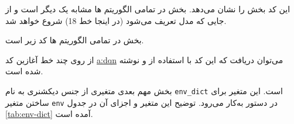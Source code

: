 

این کد بخش  را نشان می‌دهد. بخش  در تمامی الگوریتم ها مشابه یک دیگر است و از جایی که مدل تعریف می‌شود (در اینجا خط 18) شروع خواهد شد. 

بخش  در تمامی الگوریتم ها کد زیر است.


از روی چند خط آغازین کد
\hyperref[code:dqn.py]{\gls{a:dqn}}
می‌توان دریافت که این کد با استفاده از \cite{git/gym} و \cite{stable-baselines} نوشته شده است.

بخش مهم بعدی متغیری از جنس دیکشنری به نام \texttt{env\_dict} است. این متغیر برای ساختن متغیر \texttt{env} در دستور 
به‌کار می‌رود.
 توضیح این متغیر و اجزای آن در جدول \ref{tab:env-dict} آمده است.
 
